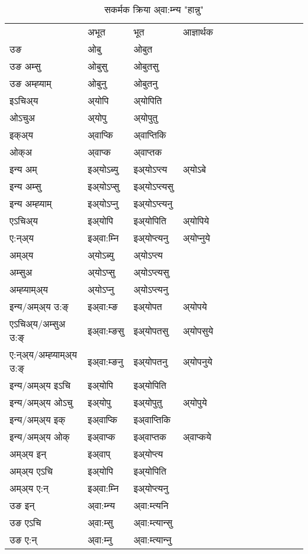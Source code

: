 \begin{table}[H]
\centering
\caption{\label{op.vt} सकर्मक क्रिया  अ्वा:म्‍न्य  "हान्नु"  }
\begin{tabular}{l|l|l|l|l|l|l|l|l|l|l|l|l}  \toprule
&अभूत & भूत & आज्ञार्थक \\ 
उङ &ओबु &ओबुत \\ 
उङ अम्सु &ओबुसु &ओबुतसु \\ 
उङ अम्ह्‍याम् &ओबुनु &ओबुतनु \\ 
इऽचिअ्य &अ्योपि &अ्योपिति   \\ 
ओऽचुअ &अ्योपु &अ्योपुतु   \\ 
इक्अ्य &अ्वाप्कि &अ्वाप्‍तिकि   \\ 
ओक्अ &अ्वाप्क &अ्वाप्‍तक   \\ 
इन्य अम् & इअ्योऽब्यु  & इअ्योऽप्‍त्य &अ्योऽबे  \\ 
इन्य अम्सु & इअ्योऽप्सु  & इअ्योऽप्‍त्यसु   \\ 
इन्य अम्ह्‍याम् & इअ्योऽप्‍नु  & इअ्योऽप्‍त्यनु   \\ 
एऽचिअ्य & इअ्योपि & इअ्योपिति &अ्योपिये    \\ 
ए:न्अ्य & इअ्वा:म्‍नि  & इअ्योप्‍त्यनु &अ्योप्‍नुये  \\ 
अम्अ्य & अ्योऽब्यु  & अ्योऽप्‍त्य  \\ 
अम्सुअ & अ्योऽप्सु & अ्योऽप्‍त्यसु  \\ 
अम्ह्‍याम्अ्य & अ्योऽप्‍नु  & अ्योऽप्‍त्यनु \\ 
\midrule
इन्य/अम्अ्य उ:ङ्‌&इअ्वा:म्ङ & इअ्योपत &अ्योपये \\ 
एऽचिअ्य/अम्सुअ उ:ङ्‌ &इअ्वा:म्ङसु & इअ्योपतसु &अ्योपसुये \\ 
ए:न्अ्य/अम्ह्‍याम्अ्य उ:ङ्‌ &इअ्वा:म्ङनु & इअ्योपतनु &अ्योपनुये \\ 
इन्य/अम्अ्य इऽचि & इअ्योपि & इअ्योपिति    \\ 
इन्य/अम्अ्य ओऽचु & इअ्योपु & इअ्योपुतु  &अ्योपुये  \\ 
इन्य/अम्अ्य इक् & इअ्वाप्कि & इअ्वाप्‍तिकि   \\ 
इन्य/अम्अ्य ओक् & इअ्वाप्क & इअ्वाप्‍तक  &अ्वाप्कये  \\ 
अम्अ्य इन् & इअ्वाप् & इअ्योप्‍त्य   \\ 
अम्अ्य एऽचि & इअ्योपि & इअ्योपिति    \\ 
अम्अ्य ए:न् & इअ्वा:म्‍नि  & इअ्योप्‍त्यनु  \\ 
\midrule
उङ इन् & अ्वा:म्‍न्य  & अ्वा:म्त्यनि  \\ 
उङ एऽचि & अ्वा:म्सु  & अ्वा:म्त्यान्सु   \\ 
उङ ए:न्& अ्वा:म्‍नु  & अ्वा:म्त्यान्‍नु   \\ 
\bottomrule
\end{tabular}
\end{table}


